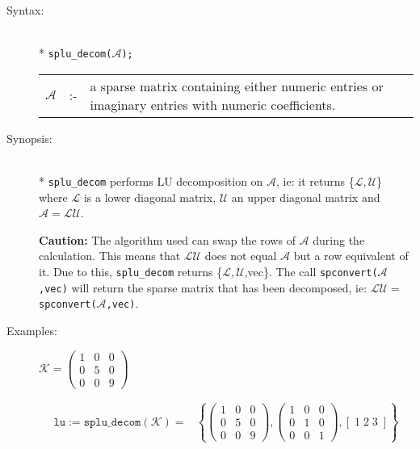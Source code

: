 \begin{description}
\item[Syntax:]\mbox{}\\*
\texttt{splu\_decom($\mathcal{A}$);}\\[2mm]
\begin{tabular}{l l p{.848\linewidth}}
$\mathcal{A}$ &:-& a sparse matrix containing either 
numeric entries or imaginary entries with numeric coefficients.
\end{tabular}

\item[Synopsis:]\mbox{}\\*
              \texttt{splu\_decom} performs LU decomposition on $\mathcal{A}$,
              ie: it returns \{$\mathcal{L,U}$\} where $\mathcal{L}$
              is a lower diagonal matrix, $\mathcal{U}$ an upper diagonal
              matrix and $\mathcal{A} = \mathcal{LU}$.

\textbf{Caution:}
The algorithm used can swap the rows of $\mathcal{A}$ 
                during the calculation. This means that $\mathcal{LU}$ does
                not equal $\mathcal{A}$ but a row equivalent of it. Due to
                this, \texttt{splu\_decom} returns \{$\mathcal{L,U}$,vec\}. The
                call \texttt{spconvert($\mathcal{A}$,vec)} will return the 
                sparse matrix that has been decomposed, ie: $\mathcal{LU} = $
                \texttt{spconvert($\mathcal{A}$,vec)}.

\item[Examples:]
\begin{flushleft}
\begin{math}  
\mathcal{K} = \begin{pmatrix} 1 & 0 & 0 \\ 0 & 5 & 0 \\ 0 & 0 & 9 \end{pmatrix}
\end{math}  
\end{flushleft}

\begin{align*}  
\texttt{lu} := \texttt{splu\_decom}(\mathcal{K}) = & 
\left\{ 
        \begin{pmatrix} 1 & 0 & 0 \\ 0 & 5 & 0 \\ 0 & 0 & 9 \end{pmatrix}, 
        \begin{pmatrix} 1 & 0 & 0 \\ 0 & 1 & 0 \\ 0 & 0 & 1 \end{pmatrix}, 
	[\; 1 \; 2 \; 3 \; ]
\right\} 
\end{align*}


\end{description}
